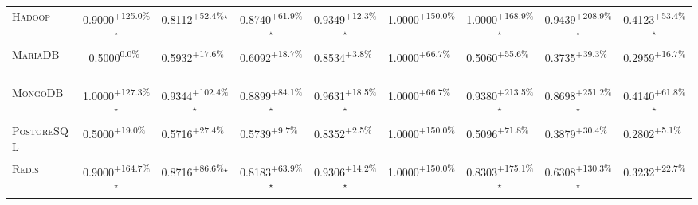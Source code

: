 \begin{table}[htbp]
\begin{tabular}{l|cccc|cccc}
\textsc{Hadoop} & \cellcolor{green!30}0.9000\textsuperscript{+125.0\%}$^\star$ & \cellcolor{green!30}0.8112\textsuperscript{+52.4\%}$^\star$ & \cellcolor{green!30}0.8740\textsuperscript{+61.9\%}$^\star$ & \cellcolor{green!30}0.9349\textsuperscript{+12.3\%}$^\star$ & \cellcolor{green!30}1.0000\textsuperscript{+150.0\%}$^{\,\,\,}$ & \cellcolor{green!30}1.0000\textsuperscript{+168.9\%}$^\star$ & \cellcolor{green!30}0.9439\textsuperscript{+208.9\%}$^\star$ & \cellcolor{green!30}0.4123\textsuperscript{+53.4\%}$^\star$ \\
\textsc{MariaDB} & \cellcolor{red!30}0.5000\textsuperscript{0.0\%}$^{\,\,\,}$ & \cellcolor{green!30}0.5932\textsuperscript{+17.6\%}$^{\,\,\,}$ & \cellcolor{green!30}0.6092\textsuperscript{+18.7\%}$^{\,\,\,}$ & \cellcolor{green!30}0.8534\textsuperscript{+3.8\%}$^{\,\,\,}$ & \cellcolor{green!30}1.0000\textsuperscript{+66.7\%}$^{\,\,\,}$ & \cellcolor{green!30}0.5060\textsuperscript{+55.6\%}$^{\,\,\,}$ & \cellcolor{green!30}0.3735\textsuperscript{+39.3\%}$^{\,\,\,}$ & \cellcolor{green!30}0.2959\textsuperscript{+16.7\%}$^{\,\,\,}$ \\
\textsc{MongoDB} & \cellcolor{green!30}1.0000\textsuperscript{+127.3\%}$^\star$ & \cellcolor{green!30}0.9344\textsuperscript{+102.4\%}$^\star$ & \cellcolor{green!30}0.8899\textsuperscript{+84.1\%}$^\star$ & \cellcolor{green!30}0.9631\textsuperscript{+18.5\%}$^\star$ & \cellcolor{green!30}1.0000\textsuperscript{+66.7\%}$^{\,\,\,}$ & \cellcolor{green!30}0.9380\textsuperscript{+213.5\%}$^\star$ & \cellcolor{green!30}0.8698\textsuperscript{+251.2\%}$^\star$ & \cellcolor{green!30}0.4140\textsuperscript{+61.8\%}$^\star$ \\
\textsc{PostgreSQL} & \cellcolor{green!30}0.5000\textsuperscript{+19.0\%}$^{\,\,\,}$ & \cellcolor{green!30}0.5716\textsuperscript{+27.4\%}$^{\,\,\,}$ & \cellcolor{green!30}0.5739\textsuperscript{+9.7\%}$^{\,\,\,}$ & \cellcolor{green!30}0.8352\textsuperscript{+2.5\%}$^{\,\,\,}$ & \cellcolor{green!30}1.0000\textsuperscript{+150.0\%}$^{\,\,\,}$ & \cellcolor{green!30}0.5096\textsuperscript{+71.8\%}$^{\,\,\,}$ & \cellcolor{green!30}0.3879\textsuperscript{+30.4\%}$^{\,\,\,}$ & \cellcolor{green!30}0.2802\textsuperscript{+5.1\%}$^{\,\,\,}$ \\
\textsc{Redis} & \cellcolor{green!30}0.9000\textsuperscript{+164.7\%}$^\star$ & \cellcolor{green!30}0.8716\textsuperscript{+86.6\%}$^\star$ & \cellcolor{green!30}0.8183\textsuperscript{+63.9\%}$^\star$ & \cellcolor{green!30}0.9306\textsuperscript{+14.2\%}$^\star$ & \cellcolor{green!30}1.0000\textsuperscript{+150.0\%}$^{\,\,\,}$ & \cellcolor{green!30}0.8303\textsuperscript{+175.1\%}$^\star$ & \cellcolor{green!30}0.6308\textsuperscript{+130.3\%}$^\star$ & \cellcolor{green!30}0.3232\textsuperscript{+22.7\%}$^{\,\,\,}$ \\

\end{tabular}
\end{table}
